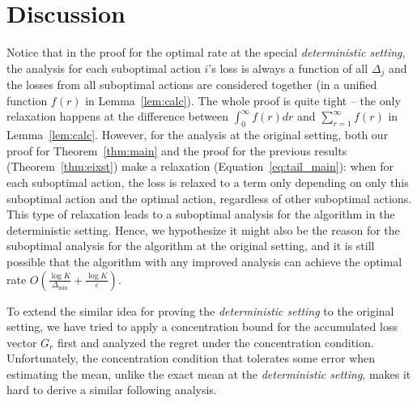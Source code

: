 \section{Discussion}
\label{sec:discuss}
Notice that in the proof for the optimal rate at the special \emph{deterministic setting}, 
the analysis for each suboptimal action $i$'s loss is always a function of all $\Delta_j$ and the losses from all suboptimal actions are considered together (in a unified function $f(r)$ in Lemma~\ref{lem:calc}).
The whole proof is quite tight -- the only relaxation happens at the difference between $\int_{0}^{\infty}f(r)dr$ and $\sum_{r=1}^{\infty}f(r)$ in Lemma~\ref{lem:calc}.
However, for the analysis at the original setting, both our proof for Theorem~\ref{thm:main} and the proof for the previous results (Theorem~\ref{thm:eixst}) make a relaxation (Equation~\ref{eq:tail_main}):
when for each suboptimal action, the loss is relaxed to a term only depending on only this suboptimal action and the optimal action, regardless of other suboptimal actions.
This type of relaxation leads to a suboptimal analysis for the algorithm in the deterministic setting.
Hence, we hypothesize it might also be the reason for the suboptimal analysis for the algorithm at the original setting, and it is still possible that the algorithm with any improved analysis can achieve the optimal rate $O\left(\frac{\log K}{\Delta_{\min}} + \frac{\log K}{\varepsilon}\right)$.

To extend the similar idea for proving the \emph{deterministic setting} to the original setting, we have tried to apply a concentration bound for the accumulated loss vector $G_{r}$ first and analyzed the regret under the concentration condition.
Unfortunately, the concentration condition that tolerates some error when estimating the mean, unlike the exact mean at the \emph{deterministic setting}, makes it hard to derive a similar following analysis.
